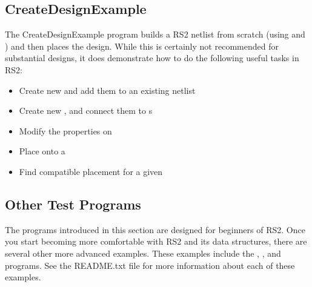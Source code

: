 \subsection{CreateDesignExample} \label{sec:createDesignExample}
The CreateDesignExample program builds a RS2 netlist from scratch (using
\cells and \cellnets) and then places the design. While this is certainly not
recommended for substantial designs, it does demonstrate how to do the
following useful tasks in RS2:

\begin{itemize}
  \item Create new \cells and add them to an existing netlist
  \item Create new \cellnets, and connect them to s
  \item Modify the properties on \cells
  \item Place \cells onto a \bels
  \item Find compatible \bel placement for a given \cell
\end{itemize}

\subsection{Other Test Programs}
The programs introduced in this section are designed for beginners of RS2. Once
you start becoming more comfortable with RS2 and its data structures,
there are several other more advanced examples. These examples include the
, , and 
programs. See the README.txt file for more information about each of these
examples.
